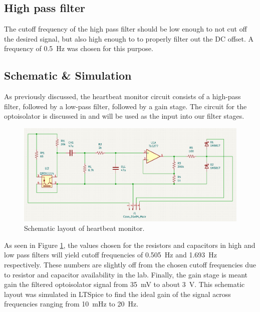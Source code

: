 \documentclass[CMPE]{../KGCOEReport}
\begin{document}
	\subsection*{High pass filter}
	The cutoff frequency of the high pass filter should be low enough to not cut
	off the desired signal, but also high enough to to properly filter out the DC offset.
	A frequency of \SI{0.5}{\hertz} was chosen for this purpose.

	\subsection*{Schematic \& Simulation}

	As previously discussed, the heartbeat monitor circuit consists of a high-pass filter,
	followed by a low-pass filter, followed by a gain stage. The circuit for the optoisolator
	is discussed in \cite{b4} and will be used as the input into our filter stages.

	\pagebreak

	\begin{figure}[h!]
        \centering
        \includegraphics[width=12cm]{schematic}
        \caption{Schematic layout of heartbeat monitor.}
        \label{fig:schematic}
	\end{figure}

	As seen in Figure \ref{fig:schematic}, the values chosen for the resistors and
	capacitors in high and low pass filters will yield cutoff frequencies of
	\SI{.505}{\hertz} and \SI{1.693}{\hertz} respectively.
	These numbers are slightly off from the chosen cutoff frequencies due to resistor
	and capacitor availability in the lab. Finally, the gain stage is meant
	gain the filtered optoisolator signal from \SI{35}{\milli\volt} to about
	\SI{3}{\volt}. This schematic layout was simulated in LTSpice to find the ideal
	gain of the signal across frequencies ranging from \SI{10}{\milli\hertz} to
	\SI{20}{\hertz}.
\end{document}
